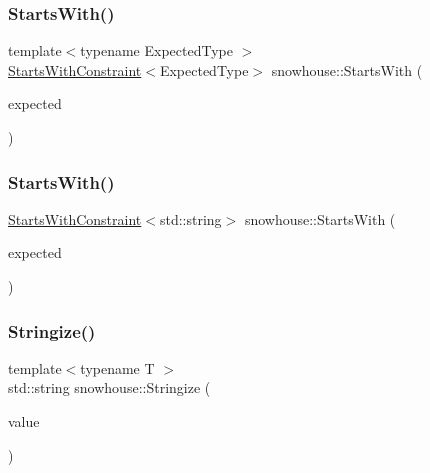 \mbox{\label{namespacesnowhouse_a4c3de58641163329edc3910f685bd042}} 
\subsubsection{\texorpdfstring{StartsWith()}{StartsWith()}\hspace{0.1cm}{\footnotesize\ttfamily [1/2]}}
{\footnotesize\ttfamily template$<$typename Expected\+Type $>$ \\
\mbox{\hyperlink{structsnowhouse_1_1StartsWithConstraint}{Starts\+With\+Constraint}}$<$Expected\+Type$>$ snowhouse\+::\+Starts\+With (\begin{DoxyParamCaption}\item[{const Expected\+Type \&}]{expected }\end{DoxyParamCaption})\hspace{0.3cm}{\ttfamily [inline]}}

\mbox{\label{namespacesnowhouse_a02ff38db9b4a0b5b9bd60f9ee329cd7b}} 
\subsubsection{\texorpdfstring{StartsWith()}{StartsWith()}\hspace{0.1cm}{\footnotesize\ttfamily [2/2]}}
{\footnotesize\ttfamily \mbox{\hyperlink{structsnowhouse_1_1StartsWithConstraint}{Starts\+With\+Constraint}}$<$std\+::string$>$ snowhouse\+::\+Starts\+With (\begin{DoxyParamCaption}\item[{const char $\ast$}]{expected }\end{DoxyParamCaption})\hspace{0.3cm}{\ttfamily [inline]}}

\mbox{\label{namespacesnowhouse_a554db10d0db5b9347e3f9f05f2981beb}} 
\subsubsection{\texorpdfstring{Stringize()}{Stringize()}}
{\footnotesize\ttfamily template$<$typename T $>$ \\
std\+::string snowhouse\+::\+Stringize (\begin{DoxyParamCaption}\item[{const T \&}]{value }\end{DoxyParamCaption})}

